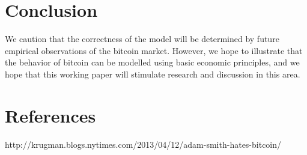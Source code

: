 \section{Conclusion}
We caution that the correctness of the model will be determined by
future empirical observations of the bitcoin market.  However, we hope
to illustrate that the behavior of bitcoin can be modelled using basic
economic principles, and we hope that this working paper will
stimulate research and discussion in this area.

\section{References}
http://krugman.blogs.nytimes.com/2013/04/12/adam-smith-hates-bitcoin/



